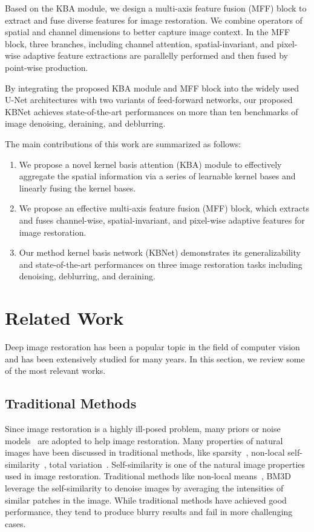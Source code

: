 \documentclass[default,iicol]{sn-jnl}
\theoremstyle{thmstyleone}\newtheorem{theorem}{Theorem}\newtheorem{proposition}[theorem]{Proposition}
\theoremstyle{thmstyletwo}\newtheorem{example}{Example}\newtheorem{remark}{Remark}
\theoremstyle{thmstylethree}\newtheorem{definition}{Definition}
\begin{document}
Based on the KBA module, we design a multi-axis feature fusion (MFF) block to extract and fuse diverse features for image restoration.
We combine operators of spatial and channel dimensions to better capture image context.
In the MFF block, three branches, including channel attention, spatial-invariant, and pixel-wise adaptive feature extractions are parallelly performed and then fused by point-wise production.

By integrating the proposed KBA module and MFF block into the widely used U-Net architectures with two variants of feed-forward networks, our proposed KBNet achieves state-of-the-art performances on more than ten benchmarks of image denoising, deraining, and deblurring.

The main contributions of this work are summarized as follows:
\begin{enumerate}
    \item We propose a novel kernel basis attention (KBA) module to effectively aggregate the spatial information via a series of learnable kernel bases and linearly fusing the kernel bases.
    \item We propose an effective multi-axis feature fusion (MFF) block, which extracts and fuses channel-wise, spatial-invariant, and pixel-wise adaptive features for image restoration.
    \item Our method kernel basis network (KBNet) demonstrates its generalizability and state-of-the-art performances on three image restoration tasks including denoising, deblurring, and deraining.
\end{enumerate}

\section{Related Work}
Deep image restoration has been a popular topic in the field of computer vision and has been extensively studied for many years. In this section, we review some of the most relevant works. 

\subsection{Traditional Methods}
Since image restoration is a highly ill-posed problem, many priors or noise models~\cite{zhang2021rethinkingNoise} are adopted to help image restoration. 
Many properties of natural images have been discussed in traditional methods, like sparsity~\cite{mairal2007sparse,SparseDictionary}, non-local self-similarity~\cite{BM3D,NLM}, total variation~\cite{variationNoiseRemove}.
Self-similarity is one of the natural image properties used in image restoration. Traditional methods like non-local means~\cite{NLM}, BM3D~\cite{BM3D} leverage the self-similarity to denoise images by averaging the intensities of similar patches in the image. 
While traditional methods have achieved good performance, they tend to produce blurry results and fail in more challenging cases. 
\end{document}
